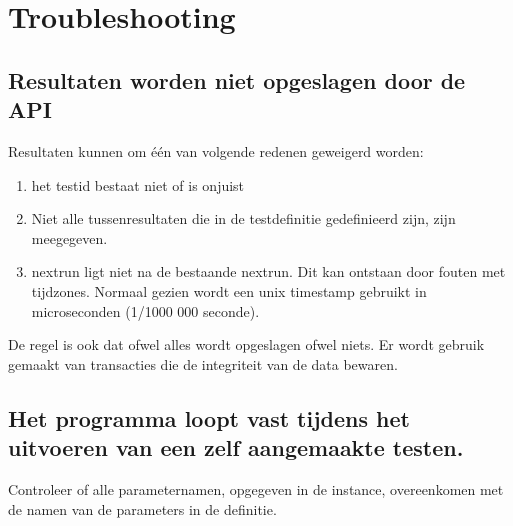 \section{Troubleshooting}
\subsection{Resultaten worden niet opgeslagen door de API}
\npar
Resultaten kunnen om \'e\'en van volgende redenen geweigerd worden:
\begin{enumerate}
\item het testid bestaat niet of is onjuist
\item Niet alle tussenresultaten die in de testdefinitie gedefinieerd zijn, zijn meegegeven. 
\item nextrun ligt niet na de bestaande nextrun. Dit kan ontstaan door fouten met tijdzones. Normaal gezien wordt een unix timestamp gebruikt in microseconden (1/1000 000 seconde).
\end{enumerate}
De regel is ook dat ofwel alles wordt opgeslagen ofwel niets. Er wordt gebruik gemaakt van transacties die de integriteit van de data bewaren.
\subsection{Het programma loopt vast tijdens het uitvoeren van een zelf aangemaakte testen.}
\npar 
Controleer of alle parameternamen, opgegeven in de instance, overeenkomen met de namen van de parameters in de definitie.